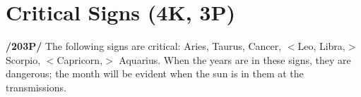 \section{Critical Signs (4K, 3P)}

\textbf{/203P/} The following signs are critical: Aries, Taurus, Cancer, $<$Leo, Libra,$>$ Scorpio, $<$Capricorn,$>$
Aquarius. When the years are in these signs, they are dangerous; the month will be evident when the sun
is in them at the transmissions.

\newpage